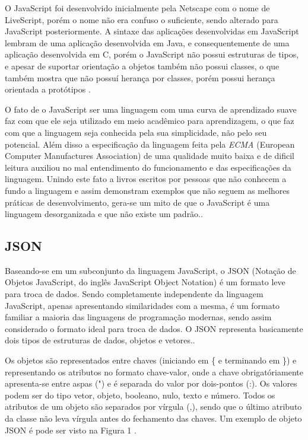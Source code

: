 O JavaScript foi desenvolvido inicialmente pela Netscape com o nome de LiveScript, porém o nome não era confuso o suficiente, sendo alterado para JavaScript posteriormente. A sintaxe das aplicações desenvolvidas em JavaScript lembram de uma aplicação desenvolvida em Java, e consequentemente de uma aplicação desenvolvida em C, porém o JavaScript não possui estruturas de tipos, e apesar de suportar orientação a objetos também não possui classes, o que também mostra que não possuí herança por classes, porém possui herança orientada a protótipos \cite{JavaScriptCrockford}.

O fato de o JavaScript ser uma linguagem com uma curva de aprendizado suave faz com que ele seja utilizado em meio acadêmico para aprendizagem, o que faz com que a linguagem seja conhecida pela sua simplicidade, não pelo seu potencial. Além disso a especificação da linguagem feita pela \emph{ECMA} (European Computer Manufactures Association) de uma qualidade muito baixa e de dificil leitura auxiliou no mal entendimento do funcionamento e das especificações da linguagem. Unindo este fato a livros escritos por pessoas que não conhecem a fundo a linguagem e assim demonstram exemplos que não seguem as melhores práticas de desenvolvimento, gera-se um mito de que o JavaScript é uma linguagem desorganizada e que não existe um padrão.\cite{JavaScriptCrockford}.

\subsection{JSON}
Baseando-se em um subconjunto da linguagem JavaScript, o JSON (Notação de Objetos JavaScript, do inglês JavaScript Object Notation) é um formato leve para troca de dados. Sendo completamente independente da linguagem JavaScript, apenas apresentando similaridades com a mesma, é um formato familiar a maioria das linguagens de programação modernas, sendo assim considerado o formato ideal para troca de dados. O JSON representa basicamente dois tipos de estruturas de dados, objetos e vetores.\cite{JSON}.

Os objetos são representados entre chaves (iniciando em \{ e terminando em \}) e representando os atributos no formato chave-valor, onde a chave obrigatóriamente apresenta-se entre aspas (") e é separada do valor por dois-pontos (:). Os valores podem ser do tipo vetor, objeto, booleano, nulo, texto e número. Todos os atributos de um objeto são separados por vírgula (,), sendo que o último atributo da classe não leva vírgula antes do fechamento das chaves. Um exemplo de objeto JSON é pode ser visto na Figura 1 \cite{JSON}.


